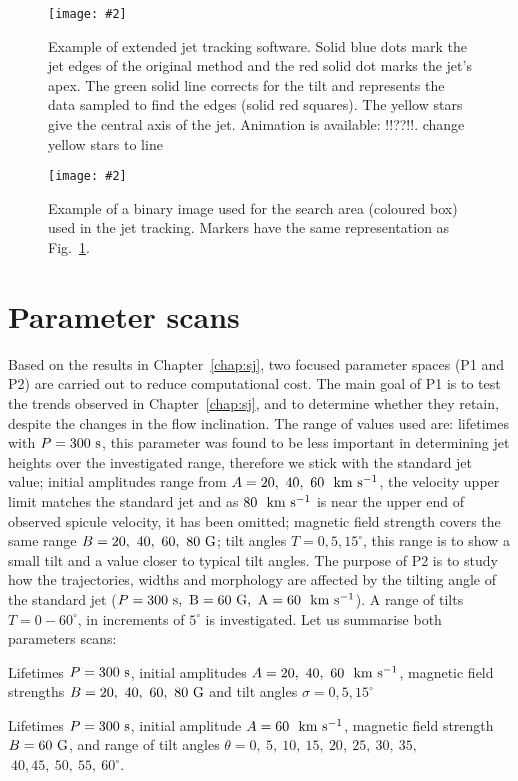 \documentclass[12pt]{ociamthesis}
\newcommand{\mfig}[4]{
  \begin{figure}
  \begin{center}
  \texttt{[image: \#2]}
  \caption{#3}
  \label{#4}
  \end{center}
  \end{figure}}
\newcommand{\kms}{~\rm{km ~s^{-1}}}
\newcommand\itemp{\item[\textbf{P2:}]}
\begin{document}
\mfig{1}{figures/jet_P300_B60A_60T_0039.png}{Example of extended jet tracking software. Solid blue dots mark the jet edges of the original method and the red solid dot marks the jet's apex. The green solid line corrects for the tilt and represents the data sampled to find the edges (solid red squares). The yellow stars give the central axis of the jet. Animation is available: !!??!!. {\color{green} change yellow stars to line}}{imporved_j_track_example}
\mfig{1}{figures/example_of_tilt_jet_code.png}{Example of a binary image used for the search area (coloured box) used in the jet tracking. Markers have the same representation as Fig.~\ref{imporved_j_track_example}.}{search_box_j_track_example}
\section{Parameter scans}
\label{sec:pscansII}
Based on the results in Chapter~\ref{chap:sj}, two focused parameter spaces (P1 and P2) are carried out to reduce computational cost. The main goal of P1 is to test the trends observed in Chapter~\ref{chap:sj}, and to determine whether they retain, despite the changes in the flow inclination. The range of values used are: lifetimes with $P=300~\rm{s}$, this parameter was found to be less important in determining jet heights over the investigated range, therefore we stick with the standard jet value; initial amplitudes range from $A=20,~40,~60~\kms$, the velocity upper limit matches the standard jet and as $80~\kms$ is near the upper end of observed spicule velocity, it has been omitted; magnetic field strength covers the same range $B=20,~40,~60,~80~\rm{G}$; tilt angles $T=0,5,15^{\circ}$, this range is to show a small tilt and a value closer to typical tilt angles. The purpose of P2 is to study how the trajectories, widths and morphology are affected by the tilting angle of the standard jet ($P=300~\rm{s}, ~B=60~\rm{G}, ~A=60~\kms$). A range of tilts $T=0-60^{\circ}$, in increments of $5^{\circ}$ is investigated. Let us summarise both parameters scans:
\begin{mylist}
\item  Lifetimes $P=300~\rm{s}$, initial amplitudes $A=20,~40,~60~\kms$, magnetic field strengths $B=20,~40,~60,~80~\rm{G}$ and tilt angles $\sigma=0,5,15^{\circ}$
\itemp Lifetimes $P=300~\rm{s}$, initial amplitude $A=60~\kms$, magnetic field strength $B=60~\rm{G}$, and range of tilt angles $\theta=0, ~5, ~10, ~15, ~20, ~25, ~30, ~35,$ $~40, 45, ~50, ~55, ~60^{\circ}$.
\end{mylist}
%
\end{document}
